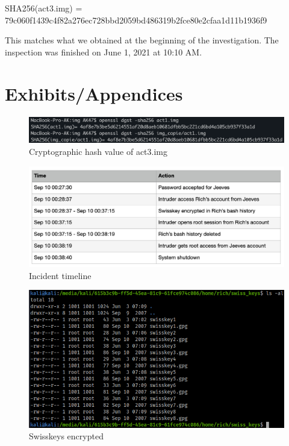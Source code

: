 \documentclass[a4paper,12pt]{article}
\begin{document}
SHA256(act3.img) = 79c060f1439c4f82a276ec728bbd2059bd486319b2fce80e2cfaa1d11b1936f9

This matches what we obtained at the beginning of the investigation. The inspection was finished on June 1, 2021 at 10:10 AM.

\section{Exhibits/Appendices}



\begin{figure}[H]
	\begin{center}
		\includegraphics[scale = 0.60]{img/act1/hash.png} 
	\end{center}
	\caption{Cryptographic hash value of act3.img}
	\label{hash}
\end{figure}

\begin{figure}[H]
	\begin{center}
		\includegraphics[scale = 0.65]{img/act1/table.png} 
	\end{center}
	\caption{Incident timeline}
	\label{table}
\end{figure}

\begin{figure}[H]
	\begin{center}
		\includegraphics[scale = 0.60]{img/act1/allswiss.png} 
	\end{center}
	\caption{Swisskeys encrypted}
	\label{allswiss}
\end{figure}
\end{document}
